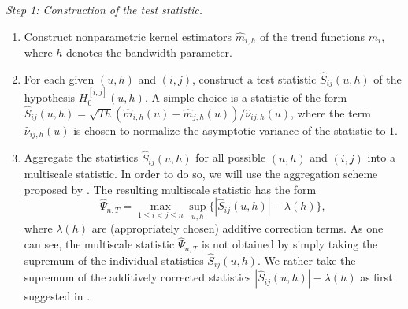 \documentclass[a4paper,12pt]{article}
\begin{document}
\noindent \textit{Step 1: Construction of the test statistic.}
\begin{enumerate}[label=(\roman*),leftmargin=0.75cm]

\item Construct nonparametric kernel estimators $\hat{m}_{i,h}$ of the trend functions $m_i$, where $h$ denotes the bandwidth parameter.   

\item For each given $(u,h)$ and $(i,j)$, construct a test statistic $\hat{S}_{ij}(u,h)$ of the hypothesis $H_0^{[i,j]}(u,h)$. A simple choice is a statistic of the form $\hat{S}_{ij}(u,h) = \sqrt{Th} (\hat{m}_{i,h}(u) - \hat{m}_{j,h}(u)) / \hat{\nu}_{ij,h}(u)$, where the term $\hat{\nu}_{ij,h}(u)$ is chosen to normalize the asymptotic variance of the statistic to $1$. 

\item Aggregate the statistics $\hat{S}_{ij}(u,h)$ for all possible $(u,h)$ and $(i,j)$ into a multiscale statistic. In order to do so, we will use the aggregation scheme proposed by \cite{DuembgenSpokoiny2001}. The resulting multiscale statistic has the form 
\[ \hat{\Psi}_{n,T} = \max_{1 \le i < j \le n} \sup_{u,h} \big\{ |\hat{S}_{ij}(u,h)| - \lambda(h) \big\},  \]
where $\lambda(h)$ are (appropriately chosen) additive correction terms. As one can see, the multiscale statistic $\hat{\Psi}_{n,T}$ is not obtained by simply taking the supremum of the individual statistics $\hat{S}_{ij}(u,h)$. We rather take the supremum of the additively corrected statistics $|\hat{S}_{ij}(u,h)| - \lambda(h)$ as first suggested in \cite{DuembgenSpokoiny2001}. 

\end{enumerate}
\end{document}
